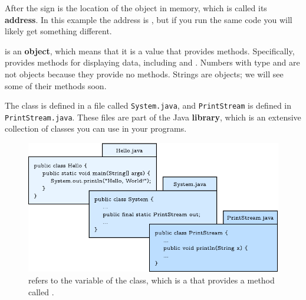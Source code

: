 After the  sign is the
location of the object in memory, which is called its {\bf address}.
In this example the address is , but if you run the same code you will likely get something different.

 is an {\bf object}, which means that it is a value
that provides methods.  Specifically,  provides methods
for displaying data, including  and .
Numbers with type  and  are not objects because
they provide no methods.  Strings are objects; we will see some of their
methods soon.


The  class is defined in a file called {\tt System.java},
and {\tt PrintStream} is defined in {\tt PrintStream.java}.  These
files are part of the Java {\bf library}, which is an extensive collection
of classes you can use in your programs.

\begin{figure}[!h]
\includegraphics{system.pdf}
\caption{ refers to the  variable of the  class, which is a  that provides a method called .}
\end{figure}

